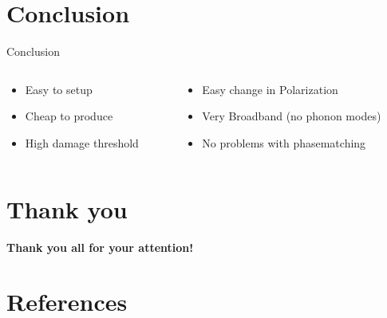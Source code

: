 \documentclass[aspectratio=1610, 9pt]{beamer}
\begin{document}
\section{Conclusion}
\begin{frame}{Conclusion}
\begin{columns}
\begin{column}{0.5\textwidth}
  \begin{center}
  \begin{itemize}
    \item Easy to setup
    \vspace{0.2in}
    \item Cheap to produce
    \vspace{0.2in}
    \item High damage threshold
  \end{itemize}
\end{center}
\end{column}
\begin{column}{.5\textwidth}
  \begin{center}
  \begin{itemize}
    \item Easy change in Polarization
    \vspace{0.2in}
    \item Very Broadband (no phonon modes)
    \vspace{0.2in}
    \item No problems with phasematching
  \end{itemize}
\end{center}
\end{column}
\end{columns}
\end{frame}

\section*{Thank you}
\begin{frame}{}
  \begin{center}
  \textbf{\textcolor{tugreen}{Thank you all for your attention!}}
  \end{center}
\end{frame}

\section{References }
\printbibliography
\end{document}
